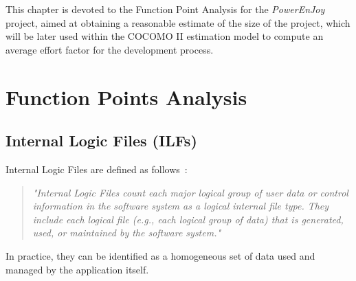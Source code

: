 This chapter is devoted to the Function Point Analysis for the \textit{PowerEnJoy} project, aimed at obtaining a reasonable estimate of the size of the project, which will be later used within the COCOMO II estimation model to compute an average effort factor for the development process.

\section{Function Points Analysis}
\subsection{Internal Logic Files (ILFs)}
Internal Logic Files are defined as follows~\cite{cocomo-manual}:
\begin{quotation}
\textit{"Internal Logic Files count each major logical group of user data or control information in the software system as a logical internal file type. They include each logical file (e.g., each logical group of data) that is generated, used, or maintained by the software system."}
\end{quotation}
\noindent
In practice, they can be identified as a homogeneous set of data used and managed by the application itself.

